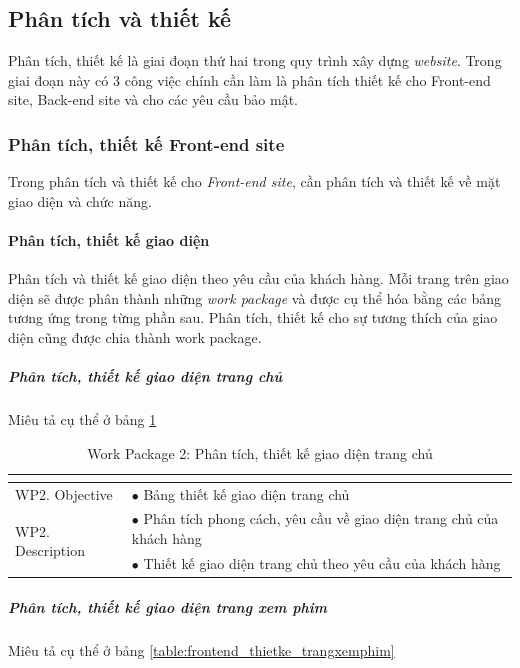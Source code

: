 \documentclass[a4paper]{book}
\begin{document}
\subsection{Phân tích và thiết kế}
Phân tích, thiết kế là giai đoạn thứ hai trong quy trình xây dựng \textit{website}. Trong giai đoạn này có 3 công việc chính cần làm là phân tích thiết kế cho Front-end site, Back-end site và cho các yêu cầu bảo mật.
\subsubsection{Phân tích, thiết kế Front-end site}
Trong phân tích và thiết kế cho \textit{Front-end site}, cần phân tích và thiết kế về mặt giao diện và chức năng.
\paragraph{Phân tích, thiết kế giao diện}
Phân tích và thiết kế giao diện theo yêu cầu của khách hàng. Mỗi trang trên giao diện sẽ được phân thành những \textit{work package} và được cụ thể hóa bằng các bảng tương ứng trong từng phần sau. Phân tích, thiết kế cho sự tương thích của giao diện cũng được chia thành work package.
\subparagraph{Phân tích, thiết kế giao diện trang chủ}Miêu tả cụ thể ở bảng \ref{table:front_end_thietke_trangchu}
\begin{table}[h!]
	\begin{center}
		\begin{tabular}{|p{4cm}|p{10cm}|}
			\hline
			\multicolumn{2}{|c|}{\cellcolor[HTML]{363636}{\color[HTML]{FFFFFF}Work package 2: Phân tích, thiết kế giao diện trang chủ}}\\
			\hline
			\multirow{1}{*}{WP2. Objective} & $\bullet$ Bảng thiết kế giao diện trang chủ\\
			\hline
			\multirow{2}{*}{WP2. Description} & $\bullet$ Phân tích phong cách, yêu cầu về giao diện trang chủ của khách hàng \\
			& $\bullet$ Thiết kế giao diện trang chủ theo yêu cầu của khách hàng\\
			\hline
		\end{tabular}
		\caption{Work Package 2: Phân tích, thiết kế giao diện trang chủ}
		\label{table:front_end_thietke_trangchu}
	\end{center}
\end{table}
\subparagraph{Phân tích, thiết kế giao diện trang xem phim}Miêu tả cụ thể ở bảng \ref{table:frontend_thietke_trangxemphim}
\end{document}
